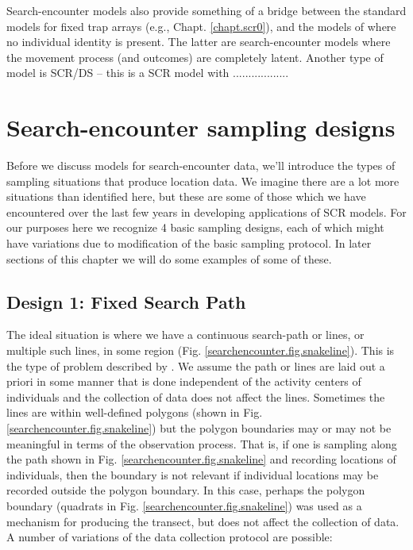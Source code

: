 Search-encounter models also provide something of a bridge between the
standard models for fixed trap arrays (e.g., Chapt. \ref{chapt.scr0}),
and the models of \citep{chandler_royle:2012} where no individual
identity is present. The latter are search-encounter models where the
movement process (and outcomes) are completely latent. Another type of
model is SCR/DS -- this is a SCR model with ..................

\section{Search-encounter sampling designs}

Before we discuss models for search-encounter data, we'll
introduce the types of sampling situations that
produce location data.  We imagine there are a lot more situations
than identified here, but these are some of those which we have
encountered over the last few years in developing applications of SCR
models.  For our purposes here we recognize 4 basic sampling designs,
each of which might have variations due to modification of the basic
sampling protocol. In later sections of this chapter we will do some
examples of some of these.

\subsection{Design 1: Fixed Search Path}

The ideal situation is where we have a continuous search-path or
lines, or multiple such lines, in some region
(Fig. \ref{searchencounter.fig.snakeline}). This is the type of
problem described by \citet{royle_etal:2011mee}. We assume the path or
lines are laid out a priori in some manner that is done independent of
the activity centers of individuals and the collection of data does
not affect the lines. Sometimes the lines are within well-defined
polygons (shown in Fig. \ref{searchencounter.fig.snakeline}) but the
polygon boundaries may or may not be meaningful in terms of the
observation process. That is, if one is sampling along the path shown
in Fig. \ref{searchencounter.fig.snakeline} and recording locations of
individuals, then the boundary is not relevant if individual locations
may be recorded outside the polygon boundary. In this case, perhaps
the polygon boundary (quadrats in
Fig. \ref{searchencounter.fig.snakeline}) was used as a mechanism for
producing the transect, but does not affect the collection of data.  A
number of variations of the data collection protocol are possible:

